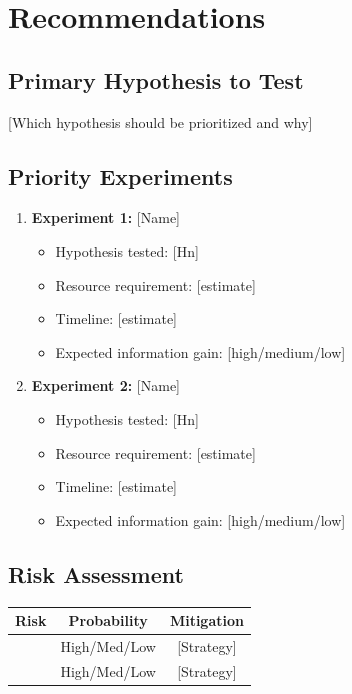 \documentclass[11pt,a4paper]{article}
\begin{document}
\section{Recommendations}

\subsection*{Primary Hypothesis to Test}
[Which hypothesis should be prioritized and why]

\subsection*{Priority Experiments}
\begin{enumerate}
    \item \textbf{Experiment 1:} [Name]
    \begin{itemize}
        \item Hypothesis tested: [Hn]
        \item Resource requirement: [estimate]
        \item Timeline: [estimate]
        \item Expected information gain: [high/medium/low]
    \end{itemize}
    \item \textbf{Experiment 2:} [Name]
    \begin{itemize}
        \item Hypothesis tested: [Hn]
        \item Resource requirement: [estimate]
        \item Timeline: [estimate]
        \item Expected information gain: [high/medium/low]
    \end{itemize}
\end{enumerate}

\subsection*{Risk Assessment}
\begin{center}
\begin{tabular}{lcc}
\toprule
\textbf{Risk} & \textbf{Probability} & \textbf{Mitigation} \\
\midrule
[Risk 1] & High/Med/Low & [Strategy] \\
[Risk 2] & High/Med/Low & [Strategy] \\
\bottomrule
\end{tabular}
\end{center}
\end{document}
